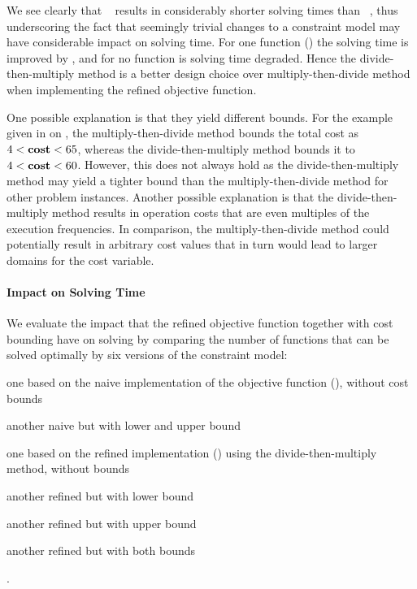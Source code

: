 We see clearly that ~
results in considerably shorter solving times than ~, thus underscoring the fact that seemingly
trivial changes to a \gls{constraint model} may have considerable impact on
solving time.
%
For one \gls{function} () the solving time is
improved by
\printZCNorm{%
  \NewOpCostFunVsOldPrePlusSolvingTimeSpeedupPrePlusSolvingTimeZeroCenteredSpeedupMax%
}, and for no \gls{function} is solving time degraded.
%
Hence the \gls{divide-then-multiply method} is a better design choice over
\gls{multiply-then-divide method} when implementing the refined \gls{objective
  function}.

One possible explanation is that they yield different bounds.
%
For the example given in  on
, the \gls{multiply-then-divide method} bounds the
total cost as \mbox{$4 < \mVar{cost} < 65$}, whereas the
\gls{divide-then-multiply method} bounds it to \mbox{$4 < \mVar{cost} < 60$}.
%
However, this does not always hold as the \gls{divide-then-multiply method} may
yield a tighter bound than the \gls{multiply-then-divide method} for other
problem instances.
%
Another possible explanation is that the \gls{divide-then-multiply method}
results in \gls{operation} costs that are even multiples of the execution
frequencies.
%
In comparison, the \gls{multiply-then-divide method} could potentially result in
arbitrary cost values that in turn would lead to larger \glspl{domain} for the
\gls{cost variable}.


\paragraph{Impact on Solving Time}

We evaluate the impact that the refined \gls{objective function} together with
cost bounding have on solving by comparing the number of \glspl{function} that
can be solved optimally by six versions of the \gls{constraint model}:
%
\begin{modelList}
  \item {}
    one based on the naive implementation of the \gls{objective function}
    (), without cost bounds
  \item {}
    another naive  but with lower and upper bound
  \item {}
    one based on the refined implementation
    () using the
    \gls{divide-then-multiply method}, without bounds
  \item {}
    another refined  but with lower bound
  \item {}
    another refined  but with upper bound
  \item {}
    another refined  but with both bounds
\end{modelList}.

